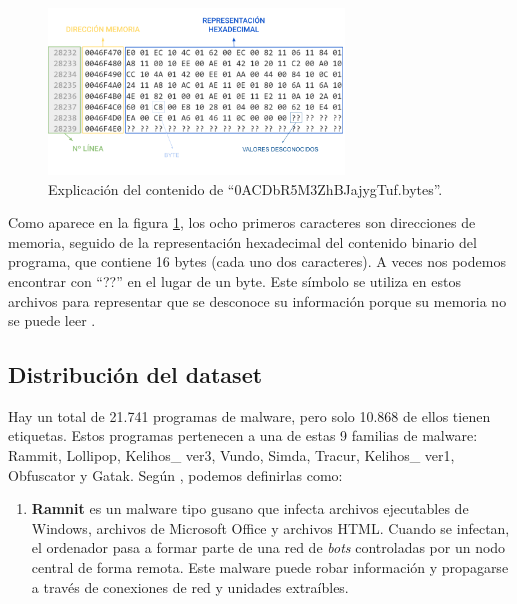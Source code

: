 \begin{figure}[h]
    \begin{center}
    \includegraphics[width=0.7\textwidth]{img/previewMMC.png}
    \end{center}
    \caption{Explicación del contenido de ``0ACDbR5M3ZhBJajygTuf.bytes''.}
    \label{fig:previewMMC}
\end{figure} 


Como aparece en la figura \ref{fig:previewMMC}, los ocho primeros caracteres son direcciones de memoria, seguido de la representación hexadecimal del contenido binario del programa, que contiene 16 bytes (cada uno dos caracteres). A veces nos podemos encontrar con ``??'' en el lugar de un byte. Este símbolo se utiliza en estos archivos para representar que se desconoce su información porque su memoria no se puede leer \citep{cahyani2022influence}. 


\subsection{Distribución del dataset}

Hay un total de 21.741 programas de malware, pero solo 10.868 de ellos tienen etiquetas. Estos programas pertenecen a una de estas 9 familias de malware: Rammit, Lollipop, Kelihos\_ ver3, Vundo, Simda, Tracur, Kelihos\_ ver1, Obfuscator y Gatak. Según \cite{hu2019machine}, podemos definirlas como: 

  

\begin{enumerate}

\item \textbf{Ramnit} es un malware tipo gusano que infecta archivos ejecutables de Windows, archivos de Microsoft Office y archivos HTML. Cuando se infectan, el ordenador pasa a formar parte de una red de \textit{bots} controladas por un nodo central de forma remota. Este malware puede robar información y propagarse a través de conexiones de red y unidades extraíbles.

\end{enumerate}


